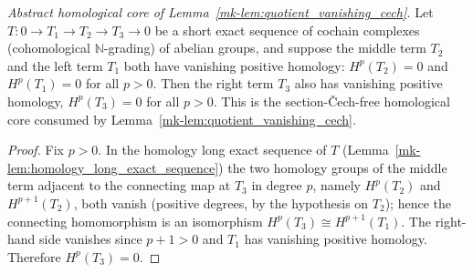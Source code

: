 \begin{lemma}\label{mk-lem:cech_homology_quotient_vanishing}
  \leanok

  \textit{Abstract homological core of Lemma~\ref{mk-lem:quotient_vanishing_cech}.}
  Let \(T : 0 \to T_1 \to T_2 \to T_3 \to 0\) be a short exact sequence of cochain complexes
  (cohomological \(\mathbb{N}\)-grading) of abelian groups, and suppose the middle term \(T_2\) and
  the left term \(T_1\) both have vanishing positive homology: \(H^p(T_2) = 0\) and \(H^p(T_1) = 0\)
  for all \(p > 0\). Then the right term \(T_3\) also has vanishing positive homology, \(H^p(T_3) =
  0\) for all \(p > 0\). This is the section-Čech-free homological core consumed by
  Lemma~\ref{mk-lem:quotient_vanishing_cech}.
\end{lemma}
\begin{proof}
  \leanok
  Fix \(p > 0\). In the homology long exact sequence of \(T\)
  (Lemma~\ref{mk-lem:homology_long_exact_sequence}) the two homology groups of the middle term
  adjacent to the connecting map at \(T_3\) in degree \(p\), namely \(H^p(T_2)\) and \(H^{p+1}(T_2)\),
  both vanish (positive degrees, by the hypothesis on \(T_2\)); hence the connecting homomorphism is
  an isomorphism \(H^p(T_3) \cong H^{p+1}(T_1)\). The right-hand side vanishes since \(p + 1 > 0\)
  and \(T_1\) has vanishing positive homology. Therefore \(H^p(T_3) = 0\).
\end{proof}

